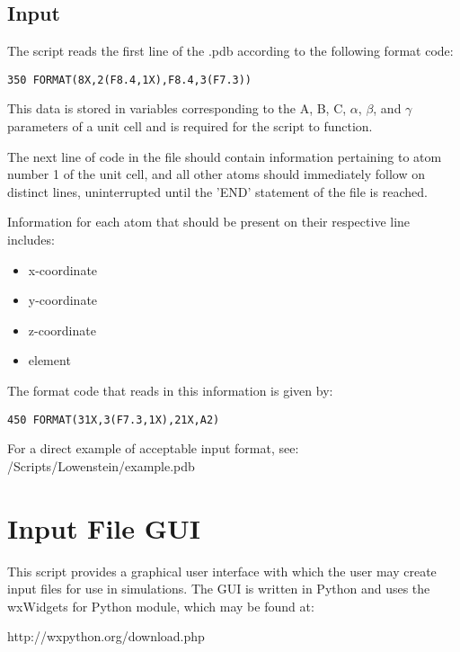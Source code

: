 \subsection{Input} \label{sec:Input}
The script reads the first line of the .pdb according to the following format code:

\begin{lstlisting}[firstnumber=184, caption=Lowenstein\_Script.f90]
    350 FORMAT(8X,2(F8.4,1X),F8.4,3(F7.3))
\end{lstlisting}

This data is stored in variables corresponding to the A, B, C, $\alpha$, $\beta$, and $\gamma$   
parameters of a unit cell and is required for the script to function.

The next line of code in the file should contain information pertaining to atom number 1 of the unit cell, and 
all other atoms should immediately follow on distinct lines, uninterrupted until the 'END' statement of the file is reached.

Information for each atom that should be present on their respective line includes:
\begin{itemize}
\item x-coordinate
\item y-coordinate
\item z-coordinate
\item element
\end{itemize}

The format code that reads in this information is given by:

\begin{lstlisting}[firstnumber=231, caption=Lowenstein\_Script.f90]
    450 FORMAT(31X,3(F7.3,1X),21X,A2)
\end{lstlisting}

For a direct example of acceptable input format, see:  /Scripts/Lowenstein/example.pdb

\section{Input File GUI} \label{Sec:GUI}
This script provides a graphical user interface with which the user may create input files for use in simulations.  The GUI is written
 in Python and uses the wxWidgets for Python module, which may be found at:   

http://wxpython.org/download.php 



